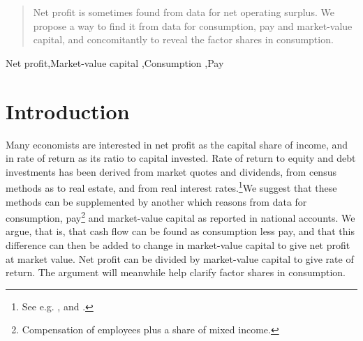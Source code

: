 \documentclass[a4paper,fleqn]{cas-sc}
\begin{document}
\begin{abstract}
Net profit is sometimes found from data for net operating surplus.  We propose a way to find it from data for consumption, pay and market-value capital, and concomitantly to reveal the factor shares in consumption.
\\
\end{abstract}



\begin{keywords}
Net profit\sep Market-value capital \sep Consumption \sep Pay
\end{keywords}

\maketitle

\section{Introduction}

Many economists are interested in net profit as the capital share of income, and in rate of return as its ratio to capital invested. 
%
Rate of return to equity and debt investments has been derived from market quotes and dividends, from census methods as to real estate, and from real interest rates.\footnote{See e.g. \cite{jorda2019}, and \cite{homer2005history}.}We suggest that these methods can be supplemented by another which reasons from data for consumption, pay\footnote{Compensation of employees plus a share of mixed income.} and market-value capital as reported in national accounts. We argue, that is,
%
that cash flow can be found as consumption less pay, and that this difference can then be added to change in market-value capital to give net profit at market value. Net profit can be divided by market-value capital to give rate of return. The argument will meanwhile help clarify factor shares in consumption.
\end{document}
